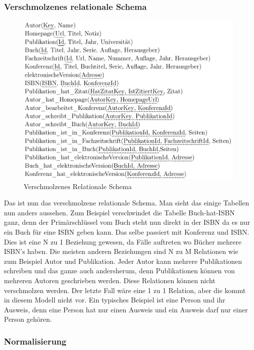 \subsubsection{Verschmolzenes relationale Schema}

\begin{figure}[!htb]
	\centering
	\includegraphics[width=13cm,keepaspectratio]{bilder/verschmolzenesRelationaleSchema}
	\caption{Verschmolzenes Relationale Schema}
	\label{fig:verschmolzenesrelationalesSchema}
\end{figure}

Das ist nun das verschmolzene relationale Schema. Man sieht das einige Tabellen nun anders aussehen. Zum Beispiel verschwindet die Tabelle Buch-hat-ISBN ganz, denn der Primärschlüssel vom Buch steht nun direkt in der ISBN da es nur ein Buch für eine ISBN geben kann. Das selbe passiert mit Konferenz und ISBN. Dies ist eine N zu 1 Beziehung gewesen, da Fälle auftreten wo Bücher mehrere ISBN's haben. Die meisten anderen Beziehungen sind N zu M Relationen wie zum Beispiel Autor und Publikation. Jeder Autor kann mehrere Publikationen schreiben und das ganze auch andersherum, denn Publikationen können von mehreren Autoren geschrieben werden. Diese Relationen können nicht verschmolzen werden. Der letzte Fall wäre eine 1 zu 1 Relation, aber die kommt in diesem Modell nicht vor. Ein typisches Beispiel ist eine Person und ihr Ausweis, denn eine Person hat nur einen Ausweis und ein Ausweis darf nur einer Person gehören.

\subsubsection{Normalisierung}

